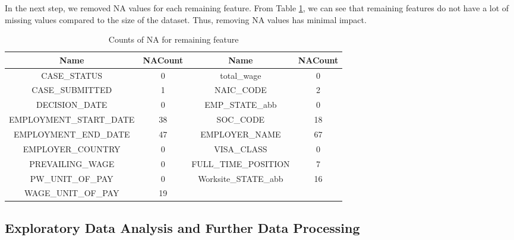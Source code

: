 \documentclass{article}
\begin{document}
In the next step, we removed NA values for each remaining feature. From Table \ref{data_intro}, we can see that remaining features do not have a lot of missing values compared to the size of the dataset. Thus, removing NA values has minimal impact. 
\begin{table}[h] \label{tab: remaining-features}
\centering
\caption{Counts of NA for remaining feature}
\label{data_intro}
\begin{tabular}{|c|c|cc}
\hline
\textbf{Name}           & \textbf{NACount} & \multicolumn{1}{c|}{\textbf{Name}}        & \multicolumn{1}{c|}{\textbf{NACount}} \\ \hline
CASE\_STATUS            & 0                & \multicolumn{1}{c|}{total\_wage}          & \multicolumn{1}{c|}{0}                \\ \hline
CASE\_SUBMITTED         & 1                & \multicolumn{1}{c|}{NAIC\_CODE}           & \multicolumn{1}{c|}{2}                \\ \hline
DECISION\_DATE          & 0                & \multicolumn{1}{c|}{EMP\_STATE\_abb}      & \multicolumn{1}{c|}{0}                \\ \hline
EMPLOYMENT\_START\_DATE & 38               & \multicolumn{1}{c|}{SOC\_CODE}            & \multicolumn{1}{c|}{18}               \\ \hline
EMPLOYMENT\_END\_DATE   & 47               & \multicolumn{1}{c|}{EMPLOYER\_NAME}       & \multicolumn{1}{c|}{67}               \\ \hline
EMPLOYER\_COUNTRY       & 0                & \multicolumn{1}{c|}{VISA\_CLASS}          & \multicolumn{1}{c|}{0}                \\ \hline
PREVAILING\_WAGE        & 0                & \multicolumn{1}{c|}{FULL\_TIME\_POSITION} & \multicolumn{1}{c|}{7}                \\ \hline
PW\_UNIT\_OF\_PAY       & 0                & \multicolumn{1}{c|}{Worksite\_STATE\_abb} & \multicolumn{1}{c|}{16}               \\ \hline
WAGE\_UNIT\_OF\_PAY     & 19               &                                           &                                       \\ \cline{1-2}
\end{tabular}%
\end{table}

\subsection{Exploratory Data Analysis and Further Data Processing}
\end{document}
